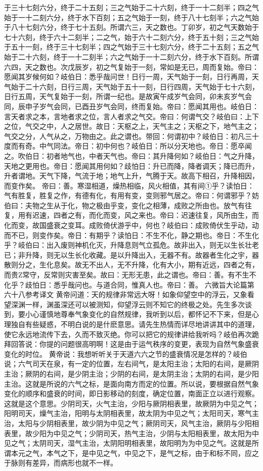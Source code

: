 \documentclass[a4paper,12pt,UTF8,twoside]{ctexbook}
\begin{document}
于三十七刻六分，终于二十五刻；三之气始于二十六刻，终于一十二刻半；四之气始于一十二刻六分，终于水下百刻；五之气始于一刻，终于八十七刻半；六之气始于八十七刻六分，终于七十五刻。所谓六三，天之数也。丁卯岁，初之气天数始于七十六刻，终于六十二刻半；二之气，始于六十二刻六分，终于五十刻；三之气始于五十一刻，终于三十七刻半；四之气始于三十七刻六分，终于二十五刻；五之气始于二十六刻，终于一十二刻半；六之气始于一十二刻六分，终于水下百刻。所谓六四，天之数也。次戊辰岁，初之气复始于一刻，常如是无已，周而复始。帝曰：愿闻其岁候何如？岐伯日：悉乎哉问世！日行一周，天气始于一刻，日行再周，天气始于二十六刻，日行三周，天气始于五十一刻，日行四周，天气始于七十六刻，日行五周，天气复始于一刻，所谓一纪也。是故寅午成岁气会同，卯未亥岁气会同，辰申子岁气会同，已酉丑岁气会同，终而复始。帝曰：愿闻其用也。岐伯日：言天者求之本，言地者求之位，言人者求之气交。帝曰：何谓气交？岐伯曰：上下之位，气交之中，人之居世。故日：天枢之上，天气主之；天枢之下，地气主之；气交之分，人气从之，万物由之。此之谓也。带回：何谓初中？岐伯日：初凡三十度而有奇。中气同法。帝日：初中何也？岐伯日：所以分天地也。帝日：愿卒闻之。吹伯日：初者地气也，中者天气也。帝曰：其升降何如？岐伯日：气之升降，天地之更用也。帝日：愿闻其用何如？歧怕日：升已而降，降者调天；降已而升，升者谓地。天气下降，气流于地；地气上升，气腾于天。故高下相召，升降相因，而变作矣。
帝曰：善。寒湿相道，燥热相临，风火相值，其有间①乎？读怕日：气有胜复，胜复之作，有德有化，有用有变，变则邪气居之。帝曰：何谓邪乎？妨伯曰：夫物之生从于化，物之极由乎变，变化之相薄，成败之所由也。放气有往复，用有迟速，四者之有，而化而变，风之来也。帝曰：迟速往复，风所由生，而化而变，故国盛衰之变耳。成败倚伏游乎中，何也？岐伯曰：成败倚伏生乎动，动而不已，则变作矣。帝日：有期乎？读怕日：不生不化，静之期也。帝日：不生化乎？岐伯曰：出入废则神机化灭，升降息则气立孤危。故非出入，则无以生长壮老已；非升降，则无以生长化收藏。是以升降出入，无器不有。故器者生化之宇，器散则分之，生化息矣。故无不出人，无不升降，化有大小，期有近远，四者之有，而贵Z常守，反常则灾害至矣。故曰：无形无患，此之谓也。帝曰：善。有不生不化乎？歧怕日：悉乎哉问也。与道合同，惟真人也。帝曰：善。
六微旨大论篇第六十八参考译文
黄帝问道：天的规律非常远大呀！如象仰望空中的浮云，又象看望深渊一样，渊虽深还可以被测知，仰望浮云则不知它的终极之处。先生多次谈到，要小心谨慎地尊奉气象变化的自然规律，我听到以后，都怀记不下来，但是心理独自有些疑惑，不明白说的是什麽意思。请先生热情而详尽地讲讲其中的道理，使它永远地流传下去，久而不致灭绝。你可以把它的规律讲给我听吗？岐伯再次跪拜回答说：你提的问题很高明啊！这是由于运气秩序的变更，表现为自然气象盛衰变化的时位。
黄帝说：我想听听关于天道六六之节的盛衰情况是怎样的？岐伯说；六气司天在泉，有一定的位置，左右间气，是太阳主治；太阳的右间，是厥阴主治；厥阴的右间，是少阴主治；少阴的右间，是太阴主治；太阴的右间，是少阳主治。这就是所说的六气之标，是面向南方而定的位置。所以说，要根据自然气象变化的顺序和盛衰的时间，即日影移动的刻度，确定位置，南面正立以进行观察。这就是这个意思。少阴司天，火气主治，少阳与厥阴相表里，故厥阴为中见之气；阳明司天，燥气主治，阳明与太阴相表里，故太阴为中见之气；太阳司天，寒气主治，太阳与少阴相表里，故少阴为中见之气；厥阴司天，风气主治，厥阴与少阳相表里，故少阳为中见之气；少阴司天，热气主治，少阴与太阳相表里，故太阳为中见之气；太阴司天，湿气主治，太阴阳明相表里，故阳明为为中见之气。这就是所谓本元之气，本气之下，是中见之气，中见之下，是气之标，由于和标不同，应之于脉则有差异，而病形也就不一样。
\end{document}
